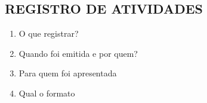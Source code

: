 \subsection{REGISTRO DE ATIVIDADES}

\begin{enumerate}
    \item O que registrar?
    \item Quando foi emitida e por quem?
    \item Para quem foi apresentada
    \item Qual o formato
\end{enumerate}